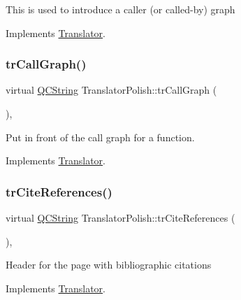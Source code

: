 This is used to introduce a caller (or called-\/by) graph 

Implements \mbox{\hyperlink{class_translator}{Translator}}.

\mbox{\label{class_translator_polish_add5826ec6c8c24fe5e7edb8bbbc99734}} 
\subsubsection{\texorpdfstring{trCallGraph()}{trCallGraph()}}
{\footnotesize\ttfamily virtual \mbox{\hyperlink{class_q_c_string}{Q\+C\+String}} Translator\+Polish\+::tr\+Call\+Graph (\begin{DoxyParamCaption}{ }\end{DoxyParamCaption})\hspace{0.3cm}{\ttfamily [inline]}, {\ttfamily [virtual]}}

Put in front of the call graph for a function. 

Implements \mbox{\hyperlink{class_translator}{Translator}}.

\mbox{\label{class_translator_polish_a3b236a99b6b4fb9dc86338841d13236a}} 
\subsubsection{\texorpdfstring{trCiteReferences()}{trCiteReferences()}}
{\footnotesize\ttfamily virtual \mbox{\hyperlink{class_q_c_string}{Q\+C\+String}} Translator\+Polish\+::tr\+Cite\+References (\begin{DoxyParamCaption}{ }\end{DoxyParamCaption})\hspace{0.3cm}{\ttfamily [inline]}, {\ttfamily [virtual]}}

Header for the page with bibliographic citations 

Implements \mbox{\hyperlink{class_translator}{Translator}}.

\mbox{\label{class_translator_polish_a0ee6755e5fb669d0b2e6676415a5bed0}} 

